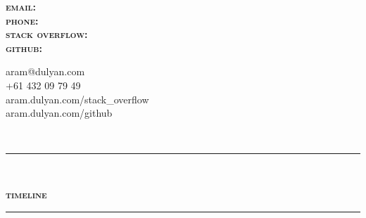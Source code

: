 \documentclass[a4paper,12pt]{article}
\begin{document}
%
\begin{spacing}{0.95}%
\pagestyle{empty}%
\begin{minipage}[b]{50mm}%
\end{minipage}%
\begin{minipage}[t]{45mm}%
	\vspace{-5mm}\begin{spacing}{0.8}\begin{flushright}{\small\textbf{\textsc{%
		email:\\
		phone:\\
		stack overflow:\\
		github:%
	}}}\end{flushright}\end{spacing}%
\end{minipage}%
\hspace{5mm}%
\begin{minipage}[t]{60mm}%
	\vspace{-6mm}\begin{spacing}{0.765}{\small%
		aram@dulyan.com\\
		+61 432 09 79 49\\
		aram.dulyan.com/stack\_overflow\\
		aram.dulyan.com/github%
	}\end{spacing}%
\end{minipage}\\
\vspace{-4mm}

\rule[1mm]{\linewidth}{2mm}\\
\begin{minipage}[t]{95.5mm}
	{\Large\textsc{\textbf{timeline}}}\\
	\rule[1mm]{\linewidth}{1mm}
	

\end{minipage}
\end{spacing}
\end{document}
